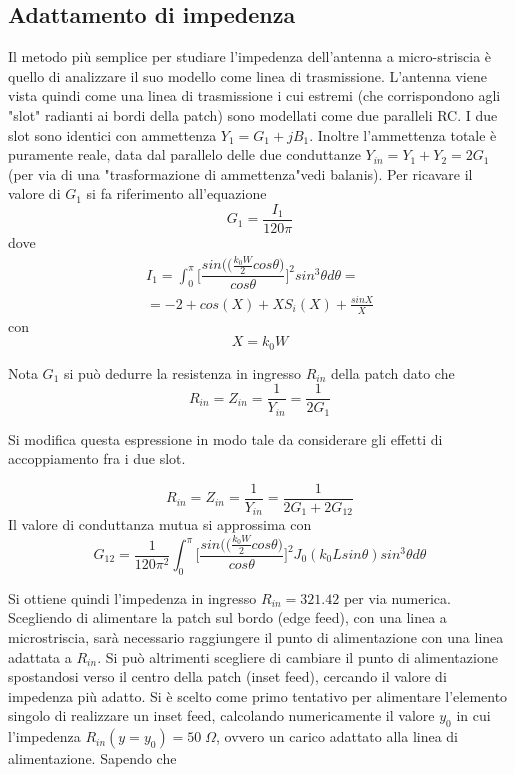 \documentclass[twoside,twocolumn]{article}
\begin{document}
\subsection*{Adattamento di impedenza}
Il metodo più semplice per studiare l'impedenza dell'antenna a micro-striscia è quello di analizzare il suo modello come linea di trasmissione.
L'antenna viene vista quindi come una linea di trasmissione i cui estremi (che corrispondono agli "slot" radianti ai bordi della patch) sono modellati come  due paralleli RC.
I due slot sono identici con ammettenza $Y_{1}=G_{1}+jB_{1}$. Inoltre l'ammettenza totale è puramente reale, data dal parallelo delle due conduttanze  $Y_{in}=Y_{1}+Y_{2}=2G_{1}$ (per via di una "trasformazione di ammettenza"vedi balanis).
Per ricavare il valore di $G_{1}$ si fa riferimento all'equazione 
\begin{equation}
G_{1}= \frac{I_{1}}{120\pi}
\end{equation}
dove 
\begin{align*}
I_{1}= \int_0^\pi \Big[\dfrac{sin (\big( \frac{k_{0}W}{2} cos\theta\big)}{cos\theta}\Big]^2 sin^3\theta d\theta = \\
=-2+cos(X)+XS_{i}(X)+\frac{sinX}{X}
\end{align*}
con 
\begin{equation}
X=k_{0}W
\end{equation}

Nota $G_{1}$ si può dedurre la resistenza in ingresso $R_{in}$ della patch dato che 
\begin{equation}
R_{in}=Z_{in}= \frac{1}{Y_{in}}=\frac{1}{2G_{1}}
\end{equation}

Si modifica questa espressione in modo tale da considerare gli effetti di accoppiamento fra i due slot.

\begin{equation}
R_{in}=Z_{in}= \frac{1}{Y_{in}}=\frac{1}{2G_{1}+2G_{12}}
\end{equation}
Il valore di conduttanza mutua si approssima con 
\begin{equation}
G_{12}= \frac{1}{120\pi^2}\int_0^\pi \Big[\dfrac{sin (\big( \frac{k_{0}W}{2} cos\theta\big)}{cos\theta}\Big]^2 J_{0}(k_{0}Lsin\theta)sin^3\theta d\theta
\end{equation}

Si ottiene quindi l'impedenza in ingresso $R_{in}= 321.42$ per via numerica.
Scegliendo di alimentare la patch sul bordo (edge feed), con una linea a microstriscia, sarà necessario raggiungere il punto di alimentazione con una linea adattata a $R_{in}$.
Si può altrimenti scegliere di cambiare il punto di alimentazione spostandosi verso il centro della patch (inset feed), cercando il valore di impedenza più adatto.
Si è scelto come primo tentativo per alimentare l'elemento singolo di realizzare un inset feed, calcolando numericamente il valore $y_{0}$ in cui l'impedenza $R_{in}(y=y_{0})= 50 \; \Omega$, ovvero un carico adattato alla linea di alimentazione.
Sapendo che 
\end{document}
